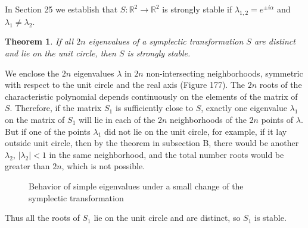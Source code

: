 \documentclass[leqno]{book}
\numberwithin{equation}{section}
\theoremstyle{plain}
\newtheorem*{thm*}{Theorem}
\let\oldendproof\endproof
\renewenvironment{proof}[1][\proofname]{%
  \oldproof[\textsc{#1}]%
}{\oldendproof}
\theoremstyle{definition}
\theoremstyle{remark}
\theoremstyle{smallcap}
\numberwithin{prob}{section}
\begin{document}
In Section 25 we establish that $S: \mathbb R^2 \rightarrow \mathbb R^2$
is strongly stable if $\lambda_{1,2} = e^{\pm i\alpha}$
and $\lambda_1 \ne \lambda_2$.

\begin{thm*}
  If all $2n$ eigenvalues of a symplectic transformation $S$ are distinct
  and lie on the unit circle, then $S$ is strongly stable.
\end{thm*}

\begin{proof}
  We enclose the $2n$ eigenvalues $\lambda$ in $2n$ non-intersecting neighborhoods,
  symmetric with respect to the unit circle and the real axis (Figure 177).
  The $2n$ roots of the characteristic polynomial depends continuously on
  the elements of the matrix of $S$.
  Therefore, if the matrix $S_1$ is sufficiently close to $S$,
  exactly one eigenvalue $\lambda_1$ on the matrix of $S_1$
  will lie in each of the $2n$ neighborhoods of the $2n$
  points of $\lambda$.
  But if one of the points $\lambda_1$ did not lie on the unit circle,
  for example, if it lay outside unit circle, then by the theorem in
  subsection B, there would be another $\lambda_2$, $|\lambda_2| < 1$
  in the same neighborhood,
  and the total number roots would be greater than $2n$,
  which is not possible.

  \setcounter{figure}{176}
  \begin{figure}[h]
    \centering
    \caption{
      Behavior of simple eigenvalues under a small change
      of the symplectic transformation
    }
  \end{figure}

  Thus all the roots of $S_1$ lie on the unit circle and are distinct,
  so $S_1$ is stable.
\end{proof}
\end{document}
